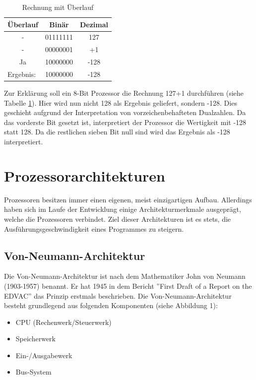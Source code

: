 \documentclass[a4paper,12pt]{article}
\begin{document}
\begin{table}[!htb]
\centering
\begin{tabular}{|c|c|c|}
\hline
\textbf{Überlauf}               & \multicolumn{1}{c|}{\textbf{Binär}} & \multicolumn{1}{c|}{\textbf{Dezimal}} \\ \hline
-                               & 01111111                            & 127                                   \\ \hline
-                               & 00000001                            & +1                                    \\ \hline
Ja                              & 10000000                            & -128                                  \\ \hline\hline
\multicolumn{1}{|l|}{Ergebnis:} & 10000000                            & -128                                  \\ \hline
\end{tabular}
\caption{Rechnung mit Überlauf}
\label{tab:ueberlauf}
\end{table}

\noindent Zur Erklärung soll ein 8-Bit Prozessor die Rechnung 127+1 durchführen (siehe Tabelle \ref{tab:ueberlauf}). Hier wird nun nicht 128 als Ergebnis geliefert, sondern -128. Dies geschieht aufgrund der Interpretation von vorzeichenbehafteten Dualzahlen. Da das vorderste Bit  gesetzt ist, interpretiert der Prozessor die Wertigkeit mit -128 statt 128. Da die restlichen sieben Bit null sind wird das Ergebnis als -128 interpretiert.
\newpage

\section{Prozessorarchitekturen}
Prozessoren besitzen immer einen eigenen, meist einzigartigen Aufbau. Allerdings haben sich im Laufe der Entwicklung einige Architekturmerkmale ausgeprägt, welche die Prozessoren verbindet. 
Ziel dieser Architekturen ist es stets, die Ausführungsgeschwindigkeit eines Programmes zu steigern.
\subsection{Von-Neumann-Architektur}
Die Von-Neumann-Architektur ist nach dem Mathematiker John von Neumann (1903-1957) benannt. Er hat 1945 in dem Bericht ''First Draft of a Report on the EDVAC'' das Prinzip erstmals beschrieben.
Die Von-Neumann-Architektur besteht grundlegend aus folgenden Komponenten \cite{von1993first} (siehe Abbildung 1):
\begin{samepage}
\begin{itemize}
\item CPU (Rechenwerk/Steuerwerk)
\item Speicherwerk 
\item Ein-/Ausgabewerk
\item Bus-System
\end{itemize}
\end{samepage}
\end{document}
